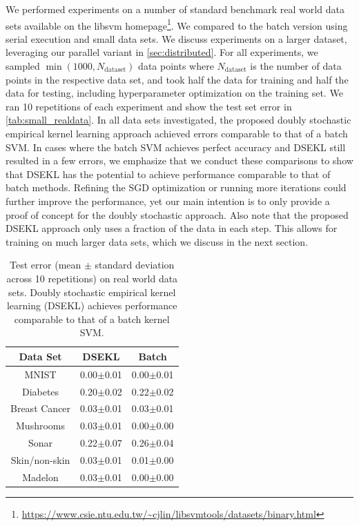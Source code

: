 \documentclass{article} %
\begin{document}
We performed experiments on a number of standard benchmark real world data sets available on the libsvm homepage\footnote{\url{https://www.csie.ntu.edu.tw/~cjlin/libsvmtools/datasets/binary.html}}. We compared to the batch version using serial execution and small data sets. We discuss experiments on a larger dataset, leveraging our parallel variant in \autoref{sec:distributed}. For all experiments, we sampled $\min(1000,N_{\text{dataset}})$ data points where $N_{\text{dataset}}$ is the number of data points in the respective data set, and took half the data for training and half the data for testing, including hyperparameter optimization on the training set. We ran 10 repetitions of each experiment and show the test set error in \autoref{tab:small_realdata}. In all data sets  investigated, the proposed doubly stochastic empirical kernel learning approach achieved errors comparable to that of a batch SVM. In cases where the batch SVM achieves perfect accuracy and DSEKL still resulted in a few errors, we emphasize that we conduct these comparisons to show that DSEKL has the potential to achieve performance comparable to that of batch methods. Refining the SGD optimization or running more iterations could further improve the performance, yet our main intention is to only provide a proof of concept for the doubly stochastic approach. Also note that the proposed DSEKL approach only uses a fraction of the data in each step. This allows for training on much larger data sets, which we discuss in the next section.
%
\begin{table}
\footnotesize
\begin{center}
\begin{tabular}{ ccc } 
Data Set & DSEKL & Batch\\
 \hline
MNIST & 0.00$\pm$0.01  & 0.00$\pm$0.01\\
Diabetes & 0.20$\pm$0.02  & 0.22$\pm$0.02\\
Breast Cancer &  0.03$\pm$0.01 & 0.03$\pm$0.01\\
Mushrooms & 0.03$\pm$0.01 & 0.00$\pm$0.00\\
Sonar & 0.22$\pm$0.07 & 0.26$\pm$0.04\\
Skin/non-skin & 0.03$\pm$0.01 &  0.01$\pm$0.00\\
Madelon & 0.03$\pm$0.01 &  0.00$\pm$0.00\\
 \hline
\end{tabular}
\caption{\footnotesize Test error (mean $\pm$ standard deviation across 10 repetitions) on real world data sets. Doubly stochastic empirical kernel learning (DSEKL) achieves performance comparable to that of a batch kernel SVM. \label{tab:small_realdata}}
\end{center}
\end{table}
%
\end{document}
